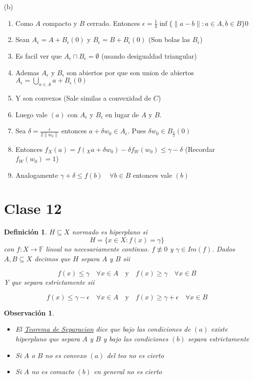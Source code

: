 \documentclass[10pt]{extarticle}
\theoremstyle{break}
\newtheorem*{remark}{Observación}
\newtheorem{definition}{Definición}[section]
\theoremstyle{definition}
\begin{document}
(b)
\begin{enumerate}
	\item Como $A$ compacto y $B$ cerrado. Entonces $\epsilon= \frac{1}{4}\inf \{ \lVert a-b \rVert:a\in A,b\in B \}0$
	\item Sean $A_{\epsilon}=A+B_{\epsilon}(0)$ y $B_{\epsilon}=B+B_{\epsilon}(0)$ (Son bolas las $B_{\epsilon}$)
\item Es facil ver que $A_{\epsilon}\cap B_{\epsilon}=\emptyset$ (usando desigualdad triangular)
\item Ademas $A_{\epsilon}$ y $B_{\epsilon}$ son abiertos por que son union de abiertos $A_{\epsilon}=\bigcup_{a\in A}a+B_{\epsilon}(0)$
\item Y son convexos (Sale similas a convexidad de $C$)
\item Luego vale $(a)$ con $A_{\epsilon}$ y $B_{\epsilon}$ en lugar de $A$ y $B$.
\item Sea $\delta= \frac{\epsilon}{2\lVert w_{0} \rVert}$ entonces $a+\delta w_{0}\in A_{\epsilon}$. Pues $\delta w_{0}\in B_{ \frac{\epsilon}{2}}(0)$
\item Entonces $f_{X}(a)=f(_{X}a+\delta w_{0})-\delta f_{W}(w_{0})\leq \gamma-\delta$ (Recordar $f_{W}(w_{0})=1$)
\item Analogamente $\gamma+\delta\leq f(b)\quad\forall b\in B$ entonces vale $(b)$
\end{enumerate}

\section{Clase 12}

\begin{definition}
$H\subseteq X$ normado es \emph{hiperplano} si $$H=\{ x\in X:f(x) =\gamma \}$$ con $f : X\rightarrow \mathbb{F}$ lineal no necesariamente continuo. $f\not\equiv 0$ y $\gamma\in Im(f)$. Dados $A,B\subseteq X$ decimos que $H$ separa $A$ y $B$ sii

$$f(x)\leq \gamma\quad\forall x\in A \quad\text{y}\quad f(x)\geq\gamma\quad\forall x\in B$$
Y que separa estrictamente sii

$$f(x)\leq \gamma-\epsilon\quad\forall x\in A\quad\text{y}\quad f(x)\geq\gamma+\epsilon\quad\forall x\in B$$

\end{definition}

\begin{remark}
\begin{itemize}
\item
	El \hyperref[teo-sep]{Teorema de Separacion} dice que bajo las condiciones de $(a)$ existe \emph{hiperplano} que separa $A$ y $B$ y bajo las condiciones $(b)$ separa estrictamente
\item
Si $A$ o $B$ no es convexo $(a)$ del teo no es cierto
\item
Si $A$ no es comacto $(b)$ en general no es cierto
\end{itemize}
\end{remark}
\end{document}
